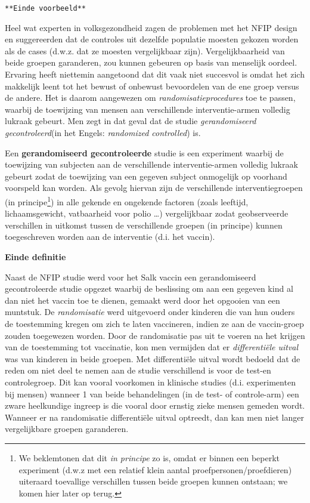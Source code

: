 \documentclass[12pt,dutch,coursenotes]{book}
\let\rmarkdownfootnote\footnote%
\def\footnote{\protect\rmarkdownfootnote}
\theoremstyle{definition}
\theoremstyle{definition}
\theoremstyle{definition}
\theoremstyle{remark}
\let\BeginKnitrBlock\begin \let\EndKnitrBlock\end
\begin{document}
\texttt{**Einde\ voorbeeld**}

Heel wat experten in volksgezondheid zagen de problemen met het NFIP
design en suggereerden dat de controles uit dezelfde populatie moesten
gekozen worden als de cases (d.w.z. dat ze moesten vergelijkbaar zijn).
Vergelijkbaarheid van beide groepen garanderen, zou kunnen gebeuren op
basis van menselijk oordeel. Ervaring heeft niettemin aangetoond dat dit
vaak niet succesvol is omdat het zich makkelijk leent tot het bewust of
onbewust bevoordelen van de ene groep versus de andere. Het is daarom
aangewezen om \emph{randomisatieprocedures} toe te passen, waarbij de
toewijzing van mensen aan verschillende interventie-armen volledig
lukraak gebeurt. Men zegt in dat geval dat de studie
\emph{gerandomiseerd gecontroleerd}(in het Engels: \emph{randomized
controlled}) is.

\BeginKnitrBlock{definition}[gerandomiseerde studie]
\protect\hypertarget{def:unnamed-chunk-15}{}{\label{def:unnamed-chunk-15}
\iffalse (gerandomiseerde studie) \fi{} }Een \textbf{gerandomiseerd
gecontroleerde} studie is een experiment waarbij de toewijzing van
subjecten aan de verschillende interventie-armen volledig lukraak
gebeurt zodat de toewijzing van een gegeven subject onmogelijk op
voorhand voorspeld kan worden. Als gevolg hiervan zijn de verschillende
interventiegroepen (in principe\footnote{We beklemtonen dat dit \emph{in
  principe} zo is, omdat er binnen een beperkt experiment (d.w.z met een
  relatief klein aantal proefpersonen/proefdieren) uiteraard toevallige
  verschillen tussen beide groepen kunnen ontstaan; we komen hier later
  op terug.}) in alle gekende en ongekende factoren (zoals leeftijd,
lichaamsgewicht, vatbaarheid voor polio \ldots{}) vergelijkbaar zodat
geobserveerde verschillen in uitkomst tussen de verschillende groepen
(in principe) kunnen toegeschreven worden aan de interventie (d.i. het
vaccin).

\textbf{Einde definitie}
\EndKnitrBlock{definition}

Naast de NFIP studie werd voor het Salk vaccin een gerandomiseerd
gecontroleerde studie opgezet waarbij de beslissing om aan een gegeven
kind al dan niet het vaccin toe te dienen, gemaakt werd door het
opgooien van een muntstuk. De \emph{randomisatie} werd uitgevoerd onder
kinderen die van hun ouders de toestemming kregen om zich te laten
vaccineren, indien ze aan de vaccin-groep zouden toegewezen worden. Door
de randomisatie pas uit te voeren na het krijgen van de toestemming tot
vaccinatie, kon men vermijden dat er \emph{differentiële uitval} was van
kinderen in beide groepen. Met differentiële uitval wordt bedoeld dat de
reden om niet deel te nemen aan de studie verschillend is voor de
test-en controlegroep. Dit kan vooral voorkomen in klinische studies
(d.i. experimenten bij mensen) wanneer 1 van beide behandelingen (in de
test- of controle-arm) een zware heelkundige ingreep is die vooral door
ernstig zieke mensen gemeden wordt. Wanneer er na randomisatie
differentiële uitval optreedt, dan kan men niet langer vergelijkbare
groepen garanderen.
\end{document}
